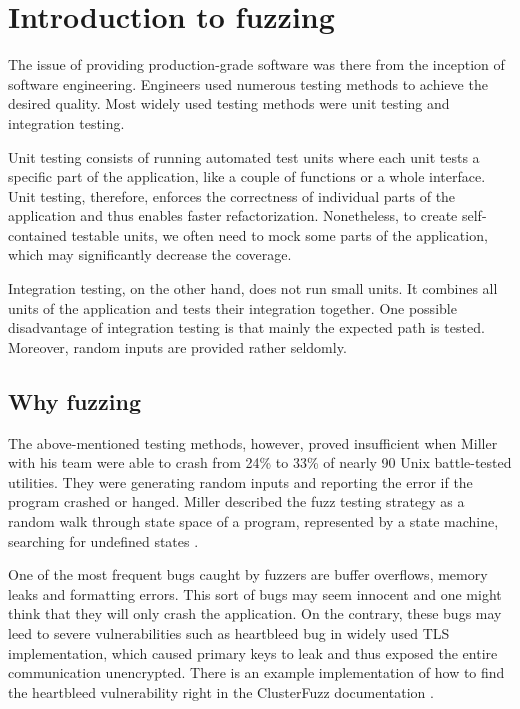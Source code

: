 \chapter{Introduction to fuzzing}
\label{cha:Introduction to fuzzing}
The issue of providing production-grade software was there from the inception of software engineering. Engineers used numerous testing methods to achieve the desired quality. Most widely used testing methods were unit testing and integration testing.

Unit testing consists of running automated test units where each unit tests a specific part of the application, like a couple of functions or a whole interface. Unit testing, therefore, enforces the correctness of individual parts of the application and thus enables faster refactorization. Nonetheless, to create self-contained testable units, we often need to mock some parts of the application, which may significantly decrease the coverage.

Integration testing, on the other hand, does not run small units. It combines all units of the application and tests their integration together. One possible disadvantage of integration testing is that mainly the expected path is tested. Moreover, random inputs are provided rather seldomly.


\section{Why fuzzing}
The above-mentioned testing methods, however, proved insufficient when Miller with his team were able to crash from 24\% to 33\% of nearly 90 Unix battle-tested utilities. They were generating random inputs and reporting the error if the program crashed or hanged. Miller described the fuzz testing strategy as a random walk through state space of a program, represented by a state machine, searching for undefined states \cite{miller1990empirical}.

One of the most frequent bugs caught by fuzzers are buffer overflows, memory leaks and formatting errors. This sort of bugs may seem innocent and one might think that they will only crash the application. On the contrary, these bugs may leed to severe vulnerabilities such as heartbleed bug \cite{heartbleed2020bug} in widely used TLS implementation, which caused primary keys to leak and thus exposed the entire communication unencrypted. There is an example implementation of how to find the heartbleed vulnerability right in the ClusterFuzz documentation \cite{clusterfuzz2020heartbleed}.


